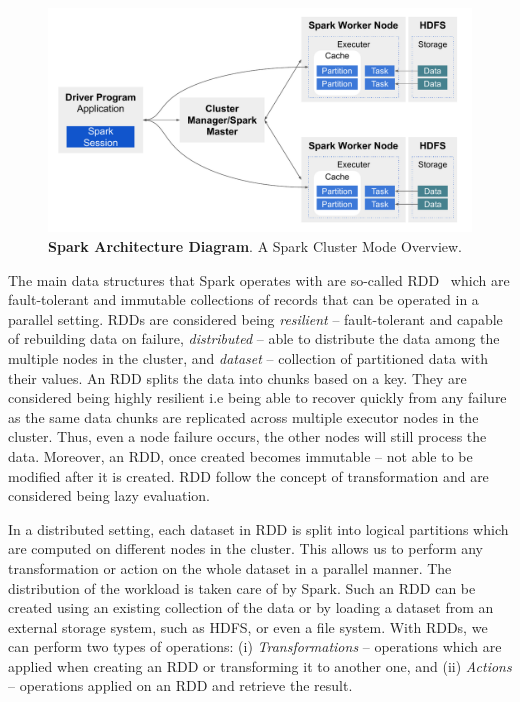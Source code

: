 \begin{figure}
\centering
\includegraphics[width=1.0\columnwidth]{images/2_preliminaries/spark-dataflow.pdf}
 \caption{\textbf{Spark Architecture Diagram}. A Spark Cluster Mode Overview.}
\label{fig:preliminaries-spark-dataflow}
\end{figure}

The main data structures that Spark operates with are so-called \gls{RDD}~\cite{zaharia2012resilient} which are fault-tolerant and immutable collections of records that can be operated in a parallel setting.
\gls{RDD}s are considered being \textit{resilient} -- fault-tolerant and capable of rebuilding data on failure, \textit{distributed} -- able to distribute the data among the multiple nodes in the cluster, and \textit{dataset} -- collection of partitioned data with their values.
An \gls{RDD} splits the data into chunks based on a key. 
They are considered being highly resilient i.e being able to recover quickly from any failure as the same data chunks are replicated across multiple executor nodes in the cluster.
Thus, even a node failure occurs, the other nodes will still process the data.
Moreover, an \gls{RDD}, once created becomes immutable -- not able to be modified after it is created.
\gls{RDD} follow the concept of transformation and are considered being lazy evaluation.

In a distributed setting, each dataset in \gls{RDD} is split into logical partitions which are computed on different nodes in the cluster.
This allows us to perform any transformation or action on the whole dataset in a parallel manner.
The distribution of the workload is taken care of by Spark.
Such an \gls{RDD} can be created using an existing collection of the data or by loading a dataset from an external storage system, such as \gls{HDFS}, or even a file system.
With \gls{RDD}s, we can perform two types of operations: (i) \textit{Transformations} -- operations which are applied when creating an \gls{RDD} or transforming it to another one, and (ii) \textit{Actions} -- operations applied on an \gls{RDD} and retrieve the result.

